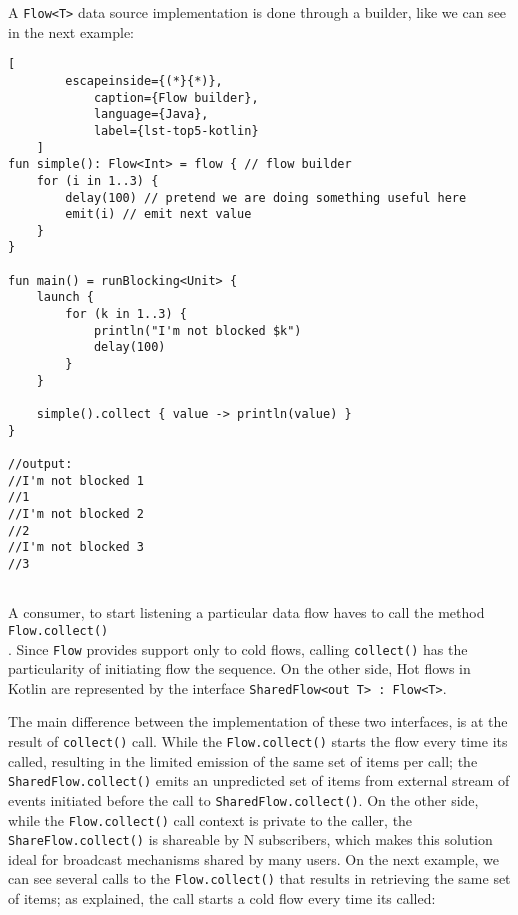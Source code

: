 A \texttt{Flow<T>} data source implementation is done through a builder, like we can see in the next example:

\begin{center}
	\lstset{basicstyle=\scriptsize\ttfamily,frame=bottomline}
	\begin{lstlisting}[
		escapeinside={(*}{*)},
			caption={Flow builder},
			language={Java},
			label={lst-top5-kotlin}
	]
fun simple(): Flow<Int> = flow { // flow builder
	for (i in 1..3) {
		delay(100) // pretend we are doing something useful here
		emit(i) // emit next value
	}
}

fun main() = runBlocking<Unit> {
	launch {
		for (k in 1..3) {
			println("I'm not blocked $k")
			delay(100)
		}
	}

	simple().collect { value -> println(value) } 
}

//output:
//I'm not blocked 1
//1
//I'm not blocked 2
//2
//I'm not blocked 3
//3
	
	\end{lstlisting}
\end{center}


A consumer, to start listening a particular data flow haves to call the method \texttt{Flow.collect()}\\. Since \texttt{Flow} provides support only to cold flows, calling \texttt{collect()} has the particularity of initiating flow the sequence.
On the other side, Hot flows in Kotlin are represented by the interface \texttt{SharedFlow<out T> : Flow<T>}. 

The main difference between the implementation of these two interfaces, is at the result of \texttt{collect()} call. 
While the \texttt{Flow.collect()} starts the flow every time its called, resulting in the limited emission of the same set of items per call; the \texttt{SharedFlow.collect()} emits an unpredicted set of items from external stream of events initiated before the call to \texttt{SharedFlow.collect()}.
On the other side, while the \texttt{Flow.collect()} call context is private to the caller, the \texttt{ShareFlow.collect()} is shareable by N subscribers, which makes this solution ideal for broadcast mechanisms shared by many users.
On the next example, we can see several calls to the \texttt{Flow.collect()} that results in retrieving the same set of items; as explained, the call starts a cold flow every time its called:

